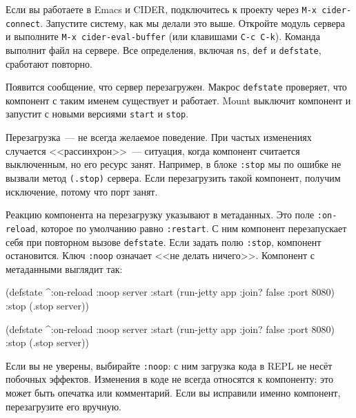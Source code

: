 
Если вы работаете в Emacs и CIDER, подключитесь к проекту через
\verb|M-x cider-connect|. Запустите систему, как мы делали это выше.
Откройте модуль сервера и выполните \texttt{M-x~cider\--eval\--buffer}
(или клавишами \verb|C-c C-k|). Команда выполнит файл на сервере.
Все определения, включая \verb|ns|, \verb|def| и \verb|defstate|,
сработают повторно.

Появится сообщение, что сервер перезагружен. Макрос \texttt{def\-state} проверяет,
что компонент с таким именем существует и работает. Mount выключит компонент и
запустит с новыми версиями \verb|start| и \verb|stop|.

Перезагрузка~--- не всегда желаемое поведение. При частых изменениях случается
<<рассинхрон>>~--- ситуация, когда компонент считается выключенным, но его
ресурс занят. Например, в блоке \verb|:stop| мы по ошибке не вызвали метод
\verb|(.stop)| сервера. Если перезагрузить такой компонент, получим исключение,
потому что порт занят.

Реакцию компонента на перезагрузку указывают в метаданных. Это поле
\verb|:on-reload|, которое по умолчанию равно \verb|:restart|. С ним компонент
перезапускает себя при повторном вызове \verb|defstate|. Если задать полю
\verb|:stop|, компонент остановится. Ключ \verb|:noop| означает <<не делать
ничего>>. Компонент с метаданными выглядит так:

\ifnarrow

\begin{english}
  \begin{clojure}
(defstate
  ^{:on-reload :noop}
  server
  :start (run-jetty app
           {:join? false :port 8080})
  :stop (.stop server))
  \end{clojure}
\end{english}

\else

\begin{english}
  \begin{clojure}
(defstate
  ^{:on-reload :noop}
  server
  :start (run-jetty app {:join? false :port 8080})
  :stop (.stop server))
  \end{clojure}
\end{english}

\fi

Если вы не уверены, выбирайте \verb|:noop|: с ним загрузка кода в REPL не несёт
побочных эффектов. Изменения в коде не всегда относятся к компоненту: это может
быть опечатка или комментарий. Если вы исправили именно компонент, перезагрузите
его вручную.

